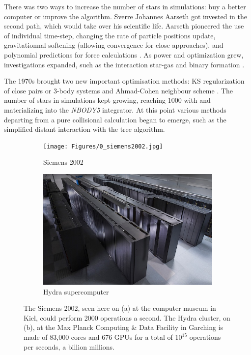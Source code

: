 There was two ways to increase the number of stars in simulations: buy a better computer or improve the algorithm. Sverre Johannes Aarseth got invested in the second path, which would take over his scientific life. Aarseth pioneered the use of individual time-step, changing the rate of particle positions update, gravitationnal softening (allowing convergence for close approaches), and polynomial predictions for force calculations \citep{Aarseth1964}. As power and optimization grew, investigations expanded, such as the interaction star-gas \citep{VanAlbada1968a} and binary formation \citep{VanAlbada1968b}.

The 1970s brought two new important optimisation methods: KS regularization of close pairs \citep{Aarseth1972} or 3-body systems \citep{Aarseth1974b} and Ahmad-Cohen neighbour scheme \citep{AhmadCohen1973}. The number of stars in simulations kept growing, reaching 1000 with \cite{Terlevich1980} and materializing into the \textit{NBODY5} integrator. At this point various methods departing from a pure collisional calculation began to emerge, such as the simplified distant interaction with the \cite{BarnesHut1986} tree algorithm.


\begin{figure}
\center
    \centering
    \begin{subfigure}[b]{0.45\textwidth}
    	\centering
    	\texttt{[image: Figures/0\_siemens2002.jpg]}
        \caption{Siemens 2002}
        \label{Fig:0_siemens}
    \end{subfigure}
    \begin{subfigure}[b]{0.45\textwidth}
    	\centering
    	\includegraphics[width=\linewidth]{Figures/0_hydra.png}
        \caption{Hydra supercomputer}
        \label{Fig:0_hydra}
    \end{subfigure}
\caption[Siemens 2002 and Hydra cluster]{The Siemens 2002, seen here on (a) at the computer museum in Kiel, could perform 2000 operations a second. The Hydra cluster, on (b), at the Max Planck Computing \& Data Facility in Garching is made of 83,000 cores and 676 GPUs for a total of $10^{15}$ operations per seconds, a billion millions. }
\label{Fig:0_computers}
\end{figure}

